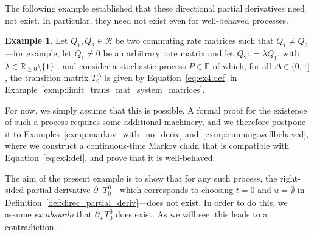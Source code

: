 \documentclass[10pt,a4paper]{paper}
\theoremstyle{definition}
\newtheorem{exmp}{Example}%
\newcommand{\reals}{\mathbb{R}}
\newcommand{\realsnonneg}{\reals_{\geq 0}}
\newcommand{\processes}{\mathbb{P}}
\newcommand{\coloneqq}{:\!=}
\begin{document}
The following example established that these directional partial derivatives need not exist. In particular, they need not exist even for well-behaved processes.
\begin{exmp}\label{exmp:well-behaved-no-deriv}
Let $Q_1,Q_2\in\mathcal{R}$ be two commuting rate matrices such that $Q_1\neq Q_2$---for example, let $Q_1\neq0$ be an arbitrary rate matrix and let $Q_2\coloneqq\lambda Q_1$, with $\lambda\in\realsnonneg\setminus\{1\}$---and consider a stochastic process $P\in\processes$ of which, for all $\Delta\in(0,1]$, the transition matrix $T_0^\Delta$ is given by Equation~\eqref{eq:ex4:def} in Example~\ref{exmp:limit_trans_mat_system_matrices}. 

For now, we simply assume that this is possible. A formal proof for the existence of such a process requires some additional machinery, and we therefore postpone it to Examples~\ref{exmp:markov_with_no_deriv} and~\ref{exmp:running:wellbehaved}, where we construct a continuous-time Markov chain that is compatible with Equation~\eqref{eq:ex4:def}, and prove that it is well-behaved.

The aim of the present example is to show that for any such process, the right-sided partial derivative $\partial_{+}{T_{0}^0}$---which corresponds to choosing $t=0$ and $u=\emptyset$ in Definition~\ref{def:direc_partial_deriv}---does not exist. In order to do this, we assume \emph{ex absurdo} that $\partial_{+}{T_{0}^0}$ does exist. As we will see, this leads to a contradiction. 


\end{exmp}
\end{document}
